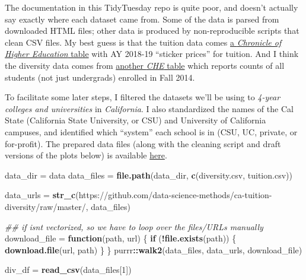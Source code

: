 \documentclass[
]{article}
\newenvironment{Shaded}{\begin{snugshade}}{\end{snugshade}}
\newcommand{\CommentTok}[1]{\textcolor[rgb]{0.56,0.35,0.01}{\textit{#1}}}
\newcommand{\ControlFlowTok}[1]{\textcolor[rgb]{0.13,0.29,0.53}{\textbf{#1}}}
\newcommand{\DecValTok}[1]{\textcolor[rgb]{0.00,0.00,0.81}{#1}}
\newcommand{\KeywordTok}[1]{\textcolor[rgb]{0.13,0.29,0.53}{\textbf{#1}}}
\newcommand{\NormalTok}[1]{#1}
\newcommand{\OperatorTok}[1]{\textcolor[rgb]{0.81,0.36,0.00}{\textbf{#1}}}
\newcommand{\StringTok}[1]{\textcolor[rgb]{0.31,0.60,0.02}{#1}}
\begin{document}
The documentation in this TidyTuesday repo is quite poor, and doesn't actually say exactly where each dataset came from. Some of the data is parsed from downloaded HTML files; other data is produced by non-reproducible scripts that clean CSV files. My best guess is that the tuition data comes \href{https://www.chronicle.com/article/tuition-and-fees-1998-99-through-2018-19/}{a \emph{Chronicle of Higher Education} table} with AY 2018-19 ``sticker prices'' for tuition. And I think the diversity data comes from \href{https://www.chronicle.com/article/student-diversity-at-4-725-institutions/}{another \emph{CHE} table} which reports counts of all students (not just undergrads) enrolled in Fall 2014.

To facilitate some later steps, I filtered the datasets we'll be using to \emph{4-year colleges and universities} in \emph{California}. I also standardized the names of the Cal State (California State University, or CSU) and University of California campuses, and identified which ``system'' each school is in (CSU, UC, private, or for-profit). The prepared data files (along with the cleaning script and draft versions of the plots below) is available \href{https://github.com/data-science-methods/ca-tuition-diversity}{here}.

\begin{Shaded}
\begin{Highlighting}[]
\NormalTok{data\_dir =}\StringTok{ \textquotesingle{}data\textquotesingle{}}
\NormalTok{data\_files =}\StringTok{ }\KeywordTok{file.path}\NormalTok{(data\_dir, }\KeywordTok{c}\NormalTok{(}\StringTok{\textquotesingle{}diversity.csv\textquotesingle{}}\NormalTok{, }\StringTok{\textquotesingle{}tuition.csv\textquotesingle{}}\NormalTok{))}

\NormalTok{data\_urls =}\StringTok{ }\KeywordTok{str\_c}\NormalTok{(}\StringTok{\textquotesingle{}https://github.com/data{-}science{-}methods/ca{-}tuition{-}diversity/raw/master/\textquotesingle{}}\NormalTok{, data\_files)}

\CommentTok{\#\# \textasciigrave{}if\textasciigrave{} isn\textquotesingle{}t vectorized, so we have to loop over the files/URLs manually}
\NormalTok{download\_file =}\StringTok{ }\ControlFlowTok{function}\NormalTok{(path, url) \{}
    \ControlFlowTok{if}\NormalTok{ (}\OperatorTok{!}\KeywordTok{file.exists}\NormalTok{(path)) \{}
        \KeywordTok{download.file}\NormalTok{(url, path)}
\NormalTok{    \}}
\NormalTok{\}}
\NormalTok{purrr}\OperatorTok{::}\KeywordTok{walk2}\NormalTok{(data\_files, data\_urls, download\_file)}

\NormalTok{div\_df =}\StringTok{ }\KeywordTok{read\_csv}\NormalTok{(data\_files[}\DecValTok{1}\NormalTok{])}
\end{Highlighting}
\end{Shaded}
\end{document}
